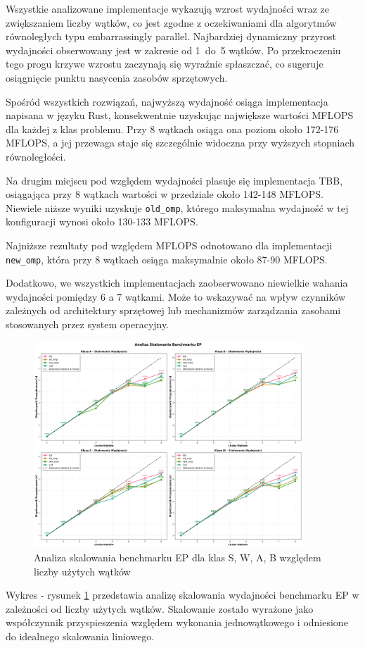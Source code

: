 Wszystkie analizowane implementacje wykazują wzrost wydajności wraz ze zwiększaniem liczby wątków, co jest zgodne z oczekiwaniami dla algorytmów równoległych typu embarrassingly parallel. Najbardziej dynamiczny przyrost wydajności obserwowany jest w zakresie od \mbox{1 do 5} wątków. Po przekroczeniu tego progu krzywe wzrostu zaczynają się wyraźnie spłaszczać, co sugeruje osiągnięcie punktu nasycenia zasobów sprzętowych.

Spośród wszystkich rozwiązań, najwyższą wydajność osiąga implementacja napisana w języku Rust, konsekwentnie uzyskując największe wartości MFLOPS dla każdej z klas problemu. Przy 8 wątkach osiąga ona poziom około 172-176 MFLOPS, a jej przewaga staje się szczególnie widoczna przy wyższych stopniach równoległości.

Na drugim miejscu pod względem wydajności plasuje się implementacja TBB, osiągająca przy 8 wątkach wartości w przedziale około 142-148 MFLOPS. Niewiele niższe wyniki uzyskuje \texttt{old\_omp}, którego maksymalna wydajność w tej konfiguracji wynosi około 130-133 MFLOPS.

Najniższe rezultaty pod względem MFLOPS odnotowano dla implementacji \texttt{new\_omp}, która przy 8 wątkach osiąga maksymalnie około 87-90 MFLOPS.

Dodatkowo, we wszystkich implementacjach zaobserwowano niewielkie wahania wydajności pomiędzy 6 a 7 wątkami. Może to wskazywać na wpływ czynników zależnych od architektury sprzętowej lub mechanizmów zarządzania zasobami stosowanych przez system operacyjny.

\begin{figure}[H]
    \centering
    \includegraphics[width=0.9\textwidth]{analiza/images/parallel/ep/x86/ep_analiza_skalowania.png}
    \caption{Analiza skalowania benchmarku EP dla klas S, W, A, B względem liczby użytych wątków}
    \label{ep_analiza_skalowania_x86_64}
\end{figure}
Wykres - rysunek \ref{ep_analiza_skalowania_x86_64} przedstawia analizę skalowania wydajności benchmarku EP w zależności od liczby użytych wątków. Skalowanie zostało wyrażone jako współczynnik przyspieszenia względem wykonania jednowątkowego i odniesione do idealnego skalowania liniowego.

